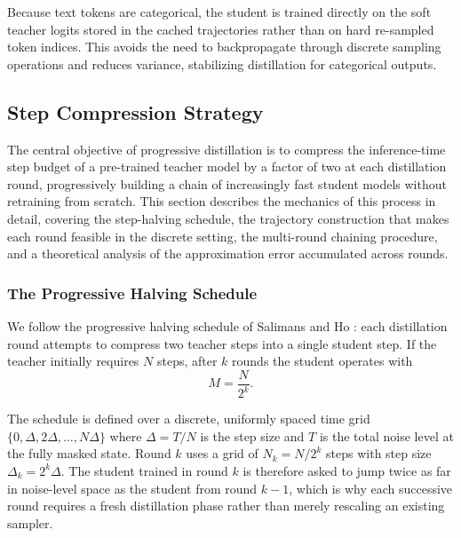 \documentclass[11pt, a4paper]{article}
\begin{document}
Because text tokens are categorical, the student is trained directly on the soft teacher logits stored in the cached trajectories rather than on hard re-sampled token indices. This avoids the need to backpropagate through discrete sampling operations and reduces variance, stabilizing distillation for categorical outputs.

\subsection{Step Compression Strategy}
\label{subsec:step_compression}

The central objective of progressive distillation is to compress the inference-time
step budget of a pre-trained teacher model by a factor of two at each distillation
round, progressively building a chain of increasingly fast student models without
retraining from scratch. This section describes the mechanics of this process in
detail, covering the step-halving schedule, the trajectory construction that makes
each round feasible in the discrete setting, the multi-round chaining procedure,
and a theoretical analysis of the approximation error accumulated across rounds.

\subsubsection{The Progressive Halving Schedule}
\label{subsubsec:halving_schedule}

We follow the progressive halving schedule of Salimans and Ho \cite{salimans2022progressive}:
each distillation round attempts to compress two teacher steps into a single
student step. If the teacher initially requires $N$ steps, after $k$ rounds the student
operates with
\begin{equation}
M = \frac{N}{2^k}.
\label{eq:step_map}
\end{equation}

The schedule is defined over a discrete, uniformly spaced time grid
$\{0, \Delta, 2\Delta, \ldots, N\Delta\}$ where $\Delta = T/N$ is the step size and
$T$ is the total noise level at the fully masked state. Round $k$ uses a grid of
$N_k = N/2^k$ steps with step size $\Delta_k = 2^k \Delta$. The student trained in
round $k$ is therefore asked to jump twice as far in noise-level space as the student
from round $k-1$, which is why each successive round requires a fresh distillation
phase rather than merely rescaling an existing sampler.
\end{document}
